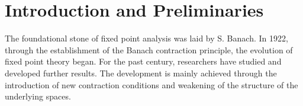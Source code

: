 \documentclass[11pt,reqno,a4paper]{amsart}
\theoremstyle{plain}
\theoremstyle{definition}
\theoremstyle{remark}
\numberwithin{equation}{section}
\begin{document}
\begin{abstract}
In this article, we introduce a novel class of mappings identified by their property of contracting the hypotenuse of a right-angled triangle in the setting of metric spaces. We establish sufficient conditions ensuring both the existence and uniqueness of fixed points. A geometric analysis, complemented by illustrative diagrams, is provided to differentiate these mappings from other familiar contraction types, namely perimeter and area contractions, supported by examples. Furthermore, we investigate the Ulam–Hyers stability of the associated fixed point equation, thereby strengthening the robustness of the theoretical framework. Finally, the derived results are applied to demonstrate the existence of solutions for a nonhomogeneous linear parabolic partial differential equation (PDE).



\end{abstract}

\maketitle

\section{Introduction and Preliminaries}
The foundational stone of fixed point analysis was laid by S. Banach. In 1922, through the establishment of the Banach contraction principle, the evolution of fixed point theory began. For the past century, researchers have studied and developed further results. The development is mainly achieved through the introduction of new contraction conditions and weakening of the structure of the underlying spaces.  
\end{document}
